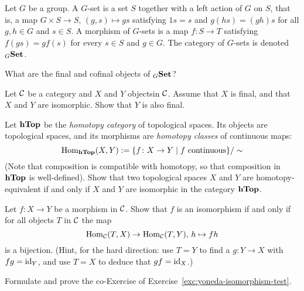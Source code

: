 \begin{exercise} Let $G$ be a group. A $G$-set is a set $S$ together with a left action of $G$ on $S$, that is, a map $G\times S \to S,\, (g,s)\mapsto gs$ satisfying $1s=s$ and $g(hs)=(gh)s$ for all $g,h \in G$ and $s\in S$. A morphism of $G$-sets is a map $f\colon S\to T$ satisfying $f(gs)=gf(s)$ for every $s\in S$ and $g\in G$. The category of $G$-sets is denoted $_{G}\mathbf{Set}$. 

What are the final and cofinal objects of $_{G}\mathbf{Set}$? 
\end{exercise}

\begin{exercise}
Let ${\mathcal{C}}$ be a category and $X$ and $Y$ objectsin ${\mathcal{C}}$. Assume that $X$ is final, and that $X$ and $Y$ are isomorphic. Show that $Y$ is also final.
\end{exercise}


\begin{exercise}
Let $\mathbf{hTop}$ be the \emph{homotopy category} of topological spaces. Its objects are 
topological spaces, and its morphisms are \emph{homotopy classes} of continuous maps:
\[
	\operatorname{Hom}_{\mathbf{hTop}}(X,Y) := \{ f\colon X\to Y \mid \text{$f$ continuous}\}/\sim
\]
(Note that composition is compatible with homotopy, so that composition in $\mathbf{hTop}$ is well-defined). Show that two topological spaces $X$ and $Y$ are homotopy-equivalent if and only if $X$ and $Y$ are isomorphic in the category $\mathbf{hTop}$. 
\end{exercise}

\begin{exercise}\label{exc:yoneda-isomorphism-test}
Let $f\colon X\to Y$ be a morphism in ${\mathcal{C}}$. Show that $f$ is an isomorphism if and only if for all objects $T$ in ${\mathcal{C}}$ the map
\[
	\operatorname{Hom}_{\mathcal{C}}(T,X) \to \operatorname{Hom}_{\mathcal{C}}(T,Y),\, h \mapsto fh
\]
is a bijection. (Hint, for the hard direction: use $T=Y$ to find a $g\colon Y\to X$ with $fg={\rm id}_Y$, and use $T=X$ to deduce that $gf={\rm id}_X$.)
\end{exercise}

\begin{exercise}Formulate and prove the co-Exercise of Exercise~\ref{exc:yoneda-isomorphism-test}.
\end{exercise}


